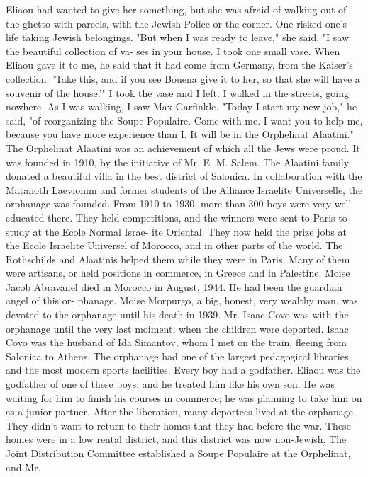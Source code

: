 Eliaou had wanted to give her something,
but she was afraid of walking out of the ghetto with parcels, with the Jewish Police or 
the corner.
One risked one's life taking Jewish belongings.
"But when I was ready to leave," she said, "I saw the beautiful collection of va-
ses in your house.
I took one small vase.
When Eliaou gave it to me, he said that it 
had come from Germany, from the Kaiser's collection.
'Take this, and if you see Bouena 
give it to her, so that she will have a souvenir of the house.'"
I took the vase and I left.
I walked in the streets, going nowhere.
As I was 
walking, I saw Max Garfinkle.
"Today I start my new job," he said, "of reorganizing the Soupe Populaire.
Come 
with me.
I want you to help me, because you have more experience than I. It will be 
in the Orphelinat Alaatini."
The Orphelinat Alaatini was an achievement of which all the Jews were proud.
It was 
founded in 1910, by the initiative of Mr.
E. M. Salem.
The Alaatini family donated a 
beautiful villa in the best district of Salonica.
In collaboration with the Matanoth 
Laevionim and former students of the Alliance Israelite Universelle, the orphanage was 
founded.
From 1910 to 1930, more than 300 boys were very well educated there.
They 
held competitions, and the winners were sent to Paris to study at the Ecole Normal Israe-
ite Oriental.
They now held the prize jobs at the Ecole Israelite Universel of Morocco, 
and in other parts of the world.
The Rothschilds and Alaatinis helped them while they were in Paris.
Many of them 
were artisans, or held positions in commerce, in Greece and in Palestine.
Moise Jacob 
Abravanel died in Morocco in August, 1944.
He had been the guardian angel of this or-
phanage.
Moise Morpurgo, a big, honest, very wealthy man, was devoted to the orphanage 
until his death in 1939.
Mr.
Isaac Covo was with the orphanage until the very last moiment, when the children were deported.
Isaac Covo was the husband of Ida Simantov, whom I met on the train, fleeing from Salonica to Athens.
The orphanage had one of the largest pedagogical libraries, and the most 
modern sports facilities.
Every boy had a godfather.
Eliaou was the godfather 
of one of these boys, and he treated him like his own son.
He was waiting for him to 
finish his courses in commerce; he was planning to take him on as a junior partner.
After the liberation, many deportees lived at the orphanage.
They didn't want to
return to their homes that they had before the war.
These homes were in a low rental 
district, and this district was now non-Jewish.
The Joint Distribution Committee established a Soupe Populaire at the Orphelinat, and Mr.
